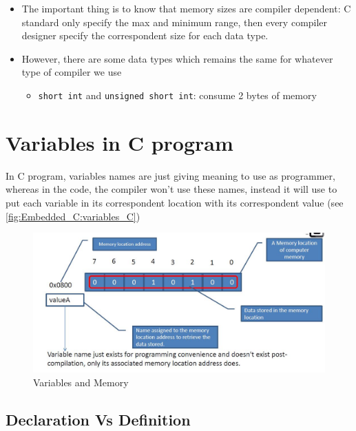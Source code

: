 \begin{itemize}
    
\item The important thing is to know that memory sizes are compiler dependent: C standard only specify the max and minimum range, then every compiler designer specify the correspondent size for each data type.

\item However, there are some data types which remains the same for whatever type  of compiler we use

\begin{itemize}
    \item \verb|short int| and \verb|unsigned short int|: consume 2 bytes of memory
\end{itemize}

\end{itemize}


\newpage
\section{Variables in C program}

In C program, variables names are just giving meaning to use as programmer, whereas in the code, the compiler won't use these names, instead it will use  to put each variable in its correspondent location with its correspondent value (see \autoref{fig:Embedded_C:variables_C})

\begin{figure}[h]
\centering
\includegraphics[scale=0.5]{Figures/Embedded_C/variables_C}
\caption{Variables and Memory}
\label{fig:Embedded_C:variables_C}
\end{figure}

\subsection{Declaration Vs Definition}

